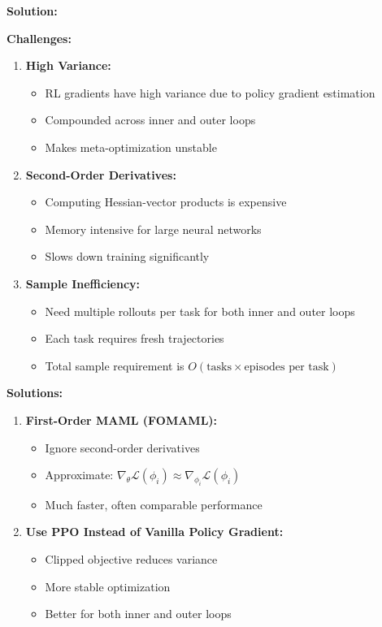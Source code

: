 \documentclass[12pt]{article}
\begin{document}
{{			\textbf{Solution:}
			
			\textbf{Challenges:}
			
			\begin{enumerate}
				\item \textbf{High Variance:}
				\begin{itemize}
					\item RL gradients have high variance due to policy gradient estimation
					\item Compounded across inner and outer loops
					\item Makes meta-optimization unstable
				\end{itemize}
				
				\item \textbf{Second-Order Derivatives:}
				\begin{itemize}
					\item Computing Hessian-vector products is expensive
					\item Memory intensive for large neural networks
					\item Slows down training significantly
				\end{itemize}
				
				\item \textbf{Sample Inefficiency:}
				\begin{itemize}
					\item Need multiple rollouts per task for both inner and outer loops
					\item Each task requires fresh trajectories
					\item Total sample requirement is $O(\text{tasks} \times \text{episodes per task})$
				\end{itemize}
			\end{enumerate}
			
			\textbf{Solutions:}
			
			\begin{enumerate}
				\item \textbf{First-Order MAML (FOMAML):}
				\begin{itemize}
					\item Ignore second-order derivatives
					\item Approximate: $\nabla_\theta \mathcal{L}(\phi_i) \approx \nabla_{\phi_i} \mathcal{L}(\phi_i)$
					\item Much faster, often comparable performance
				\end{itemize}
				
				\item \textbf{Use PPO Instead of Vanilla Policy Gradient:}
				\begin{itemize}
					\item Clipped objective reduces variance
					\item More stable optimization
					\item Better for both inner and outer loops
				\end{itemize}
				

\end{enumerate}}}
\end{document}
